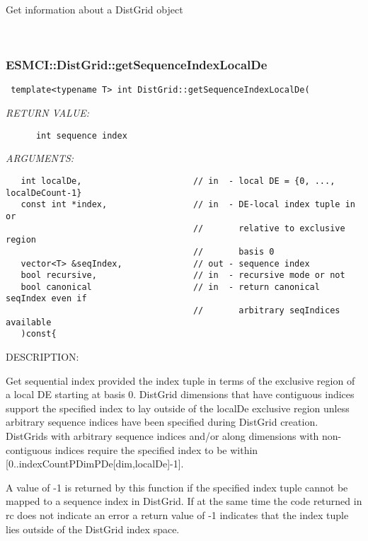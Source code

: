       Get information about a DistGrid object
   
 
\mbox{}\hrulefill\
 
\subsubsection [ESMCI::DistGrid::getSequenceIndexLocalDe] {ESMCI::DistGrid::getSequenceIndexLocalDe}


  
\begin{verbatim} template<typename T> int DistGrid::getSequenceIndexLocalDe(\end{verbatim}{\em RETURN VALUE:}
\begin{verbatim}      int sequence index\end{verbatim}{\em ARGUMENTS:}
\begin{verbatim}   int localDe,                      // in  - local DE = {0, ..., localDeCount-1}
   const int *index,                 // in  - DE-local index tuple in or 
                                     //       relative to exclusive region
                                     //       basis 0
   vector<T> &seqIndex,              // out - sequence index
   bool recursive,                   // in  - recursive mode or not
   bool canonical                    // in  - return canonical seqIndex even if
                                     //       arbitrary seqIndices available
   )const{\end{verbatim}
{\sf DESCRIPTION:\\ }


      Get sequential index provided the index tuple in terms of the exclusive
      region of a local DE starting at basis 0. DistGrid dimensions that have
      contiguous indices support the specified index to lay outside of the
      localDe exclusive region unless arbitrary sequence indices have been
      specified during DistGrid creation. DistGrids with arbitrary sequence
      indices and/or along dimensions with non-contiguous indices require
      the specified index to be within [0..indexCountPDimPDe[dim,localDe]-1].
  
      A value of -1 is returned by this function if the specified index tuple
      cannot be mapped to a sequence index in DistGrid. If at the same time
      the code returned in rc does not indicate an error a return value of -1
      indicates that the index tuple lies outside of the DistGrid index space.
   
